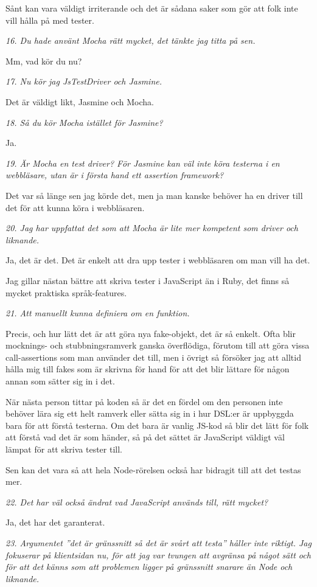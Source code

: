 \documentclass[11pt]{article}
\begin{document}
Sånt kan vara väldigt irriterande och det är sådana saker som gör att folk inte vill hålla på med tester.

\emph{16. Du hade använt Mocha rätt mycket, det tänkte jag titta på sen.}

Mm, vad kör du nu?

\emph{17. Nu kör jag JsTestDriver och Jasmine.}

Det är väldigt likt, Jasmine och Mocha.

\emph{18. Så du kör Mocha istället för Jasmine?}

Ja.

\emph{19. Är Mocha en test driver? För Jasmine kan väl inte köra testerna i en webbläsare, utan är i första hand ett assertion framework?}

Det var så länge sen jag körde det, men ja man kanske behöver ha en driver till det för att kunna köra i webbläsaren.

\emph{20. Jag har uppfattat det som att Mocha är lite mer kompetent som driver och liknande.}

Ja, det är det. Det är enkelt att dra upp tester i webbläsaren om man vill ha det.

Jag gillar nästan bättre att skriva tester i JavaScript än i Ruby, det finns så mycket praktiska språk-features.

\emph{21. Att manuellt kunna definiera om en funktion.}

Precis, och hur lätt det är att göra nya fake-objekt, det är så enkelt. Ofta blir mocknings- och stubbningsramverk ganska överflödiga, förutom till att göra vissa call-assertions som man använder det till, men i övrigt så försöker jag att alltid hålla mig till fakes som är skrivna för hand för att det blir lättare för någon annan som sätter sig in i det.

När nästa person tittar på koden så är det en fördel om den personen inte behöver lära sig ett helt ramverk eller sätta sig in i hur DSL:er är uppbyggda bara för att förstå testerna. Om det bara är vanlig JS-kod så blir det lätt för folk att förstå vad det är som händer, så på det sättet är JavaScript väldigt väl lämpat för att skriva tester till.

Sen kan det vara så att hela Node-rörelsen också har bidragit till att det testas mer.

\emph{22. Det har väl också ändrat vad JavaScript används till, rätt mycket?}

Ja, det har det garanterat.

\emph{23. Argumentet ”det är gränssnitt så det är svårt att testa” håller inte riktigt. Jag fokuserar på klientsidan nu, för att jag var tvungen att avgränsa på något sätt och för att det känns som att problemen ligger på gränssnitt snarare än Node och liknande.}
\end{document}
